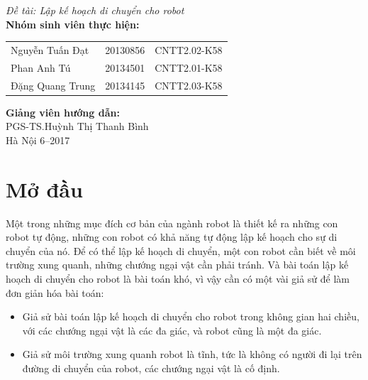 \documentclass[a4paper,12pt]{report}
\renewcommand{\contentsname}{Mục lục}
\begin{document}
\begin{center}
{\fontsize{18}{20}\selectfont \emph{Đề tài: Lập kế hoạch di chuyển cho robot}}\\[2cm]
\hspace{-5cm}\fontsize{14}{16}\selectfont \textbf{Nhóm sinh viên thực hiện:}\\[0.1cm] 
\begin{longtable}{l c c}
Nguyễn Tuấn Đạt & 20130856 & CNTT2.02-K58 \\
Phan Anh Tú &   20134501 & CNTT2.01-K58\\
Đặng Quang Trung & 20134145 & CNTT2.03-K58 \\
\end{longtable}
\vspace{0.5cm}
\hspace{-6cm}\fontsize{14}{16}\selectfont \textbf{Giảng viên hướng dẫn:}\\[0.1cm]
\hspace{-2.7cm}\fontsize{14}{16}\selectfont PGS-TS.Huỳnh Thị Thanh Bình \\[3cm]
\fontsize{16}{19}\selectfont Hà Nội 6--2017
\end{center}
\newpage
\pdfbookmark{\contentsname}{toc}
\tableofcontents
\listoffigures

\chapter{Mở đầu}
Một trong những mục đích cơ bản của ngành robot là thiết kế ra những con robot tự động, những con robot có khả năng tự động lập kế hoạch cho sự di chuyển của nó. Để có thể lập kế hoạch di chuyển, một con robot cần biết về môi trường xung quanh, những chướng ngại vật cần phải tránh. Và bài toán lập kế hoạch di chuyển cho robot là bài toán khó, vì vậy cần có một vài giả sử để làm đơn giản hóa bài toán: 
\begin{itemize}
\item Giả sử bài toán lập kế hoạch di chuyển cho robot trong không gian hai chiều, với các chướng ngại vật là các đa giác, và robot cũng là một đa giác. 
\item Giả sử môi trường xung quanh robot là tĩnh, tức là không có người đi lại trên đường di chuyển của robot, các chướng ngại vật là cố định.
\end{itemize}
\end{document}
